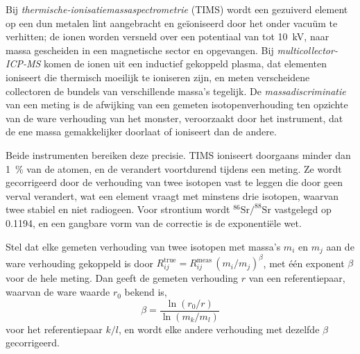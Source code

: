 \begin{definition}\label{def:b2:field-lab-methods-2:tims}
Bij \emph{thermische-ionisatiemassaspectrometrie} (TIMS) wordt een
gezuiverd element op een dun metalen lint aangebracht en geïoniseerd door het onder vacuüm te verhitten; de ionen
worden versneld over een potentiaal van tot \qty{10}{kV}, naar massa gescheiden in een magnetische sector
en opgevangen. Bij \emph{multicollector-ICP-MS} komen de ionen uit een
inductief gekoppeld plasma, dat elementen ioniseert die thermisch moeilijk te ioniseren zijn, en meten verscheidene
collectoren de bundels van verschillende massa's tegelijk. De
\emph{massadiscriminatie} van een meting is de afwijking van een gemeten isotopenverhouding ten opzichte van de ware
verhouding van het monster, veroorzaakt door het instrument, dat de ene massa gemakkelijker doorlaat of ioniseert dan
de andere.
\end{definition}

Beide instrumenten bereiken deze precisie. TIMS ioniseert doorgaans minder dan
\qty{1}{\percent} van de atomen, en de  verandert voortdurend tijdens een meting. Ze wordt gecorrigeerd door de verhouding van twee isotopen vast te leggen die door geen
verval verandert, wat een element vraagt met minstens drie isotopen, waarvan twee stabiel en niet
radiogeen. Voor strontium wordt $^{86}\mathrm{Sr}/^{88}\mathrm{Sr}$ vastgelegd op 0.1194, en een gangbare
vorm van de correctie is de exponentiële wet.

\begin{proposition}\label{prop:b2:field-lab-methods-2:bias}
Stel dat elke gemeten verhouding van twee isotopen met massa's $m_i$ en $m_j$ aan de ware
verhouding gekoppeld is door $R_{ij}^{\mathrm{true}} = R_{ij}^{\mathrm{meas}}\,(m_i/m_j)^{\beta}$, met één exponent
$\beta$ voor de hele meting. Dan geeft de gemeten verhouding $r$ van een referentiepaar, waarvan de ware waarde
$r_0$ bekend is,
\begin{equation}
\beta = \frac{\ln(r_0/r)}{\ln(m_k/m_l)}
\label{eq:b2:field-lab-methods-2:beta}
\end{equation}
voor het referentiepaar $k/l$, en wordt elke andere verhouding met dezelfde $\beta$ gecorrigeerd.
\end{proposition}

